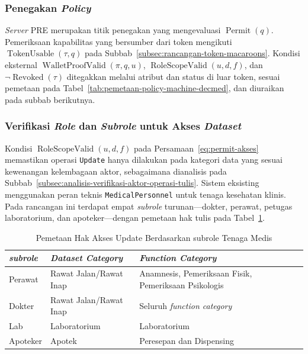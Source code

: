 \subsubsection{Penegakan \textit{Policy}}
\label{subsubsec:penegakan-kebijakan}

\textit{Server} PRE merupakan titik penegakan yang mengevaluasi $\operatorname{Permit}(q)$. Pemeriksaan kapabilitas yang bersumber dari token mengikuti $\operatorname{TokenUsable}(\tau,q)$ pada Subbab~\ref{subsec:rancangan-token-macaroons}. Kondisi eksternal $\operatorname{WalletProofValid}(\pi,q,u)$, $\operatorname{RoleScopeValid}(u,d,f)$, dan $\neg\operatorname{Revoked}(\tau)$ ditegakkan melalui atribut dan status di luar token, sesuai pemetaan pada Tabel~\ref{tab:pemetaan-policy-machine-decmed}, dan diuraikan pada subbab berikutnya.

\subsubsection{Verifikasi \textit{Role} dan \textit{Subrole} untuk Akses \textit{Dataset}}
\label{subsubsec:verifikasi-role-tenaga-medis-untuk-akses-dataset}

Kondisi $\operatorname{RoleScopeValid}(u,d,f)$ pada Persamaan~\ref{eq:permit-akses} memastikan operasi \texttt{Update} hanya dilakukan pada kategori data yang sesuai kewenangan kelembagaan aktor, sebagaimana dianalisis pada Subbab~\ref{subsec:analisis-verifikasi-aktor-operasi-tulis}. Sistem eksisting menggunakan peran teknis \texttt{MedicalPersonnel} untuk tenaga kesehatan klinis. Pada rancangan ini terdapat empat \textit{subrole} turunan---dokter, perawat, petugas laboratorium, dan apoteker---dengan pemetaan hak tulis pada Tabel~\ref{tab:pemetaan-hak-akses-update-subrole}.

\begin{table}[H]
	\centering
	\caption{Pemetaan Hak Akses Update Berdasarkan subrole Tenaga Medis}
	\label{tab:pemetaan-hak-akses-update-subrole}
	\begin{tabular}{|p{}|p{}|p{}|}
		\hline
		\textbf{\textit{subrole}} & \textbf{\textit{Dataset Category}} & \textbf{\textit{Function Category}}                  \\
		\hline
		Perawat                   & Rawat Jalan/Rawat Inap             & Anamnesis, Pemeriksaan Fisik, Pemeriksaan Psikologis \\
		\hline
		Dokter                    & Rawat Jalan/Rawat Inap             & Seluruh \textit{function category}                   \\
		\hline
		Lab                       & Laboratorium                       & Laboratorium                                         \\
		\hline
		Apoteker                  & Apotek                             & Peresepan dan Dispensing                             \\
		\hline
	\end{tabular}
\end{table}


